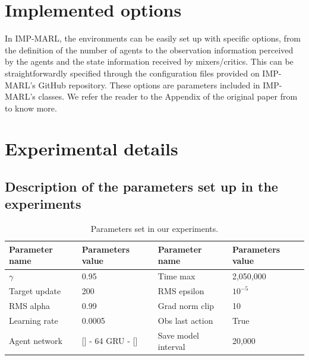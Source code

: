 \section{Implemented options}
\label{sec:ch5_appendix_options}
In IMP-MARL, the environments can be easily set up with specific options, from the definition of the number of agents to the observation information perceived by the agents and the state information received by mixers/critics. 
This can be straightforwardly specified through the configuration files provided on IMP-MARL's GitHub repository.
These options are parameters included in IMP-MARL's classes.
We refer the reader to the Appendix of the original paper from \cite{leroy2023impmarl} to know more.

\section{Experimental details}
\label{sec:ch5_appendix_exp_details}

\subsection{Description of the parameters set up in the experiments}
\label{sec:ch5_appendix_param}
\begin{table}
  \centering
  \setlength\tabcolsep{4.5pt}
  \begin{tabular}{llll}
    \toprule
    Parameter name & Parameters value & Parameter name & Parameters value \\
    \midrule
    $\gamma$ & 0.95 & Time max & 2,050,000 \\
    Target update & 200  & RMS epsilon &  $10^{-5}$ \\
    RMS alpha &  0.99  & Grad norm clip & 10 \\
    Learning rate & 0.0005 &Obs last action & True \\
    Agent network & [] - 64 GRU - [] &Save model interval & 20,000 \\
    \bottomrule
  \end{tabular}
  \caption{Parameters set in our experiments.}
  \label{tab:exp_details_common}
\end{table}


